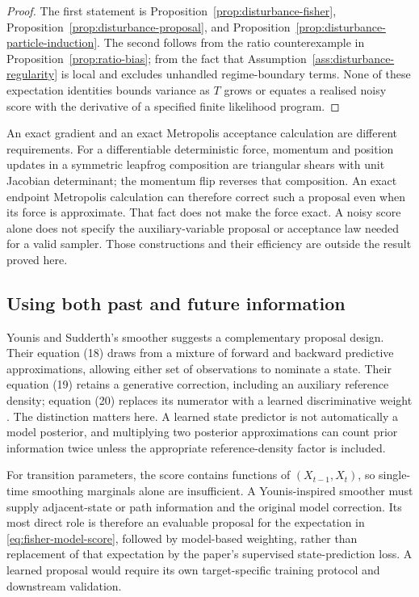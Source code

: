 \documentclass[11pt]{article}
\begin{document}
\begin{proof}
The first statement is Proposition~\ref{prop:disturbance-fisher},
Proposition~\ref{prop:disturbance-proposal}, and
Proposition~\ref{prop:disturbance-particle-induction}. The second follows from the
ratio counterexample in Proposition~\ref{prop:ratio-bias}; from the fact that
Assumption~\ref{ass:disturbance-regularity} is local and excludes unhandled
regime-boundary terms. None of these expectation identities bounds variance
as $T$ grows or equates a realised noisy score with the derivative of a
specified finite likelihood program.
\end{proof}

An exact gradient and an exact Metropolis acceptance calculation are
different requirements. For a differentiable deterministic force, momentum
and position updates in a symmetric leapfrog composition are triangular
shears with unit Jacobian determinant; the momentum flip reverses that
composition. An exact endpoint Metropolis calculation can therefore
correct such a proposal even when its force is approximate. That fact does
not make the force exact. A noisy score alone
does not specify the auxiliary-variable proposal or acceptance law needed
for a valid sampler. Those constructions and their efficiency are outside
the result proved here.

\subsection{Using both past and future information}

Younis and Sudderth's smoother suggests a complementary proposal design.
Their equation (18) draws from a mixture of forward and backward predictive
approximations, allowing either set of observations to nominate a state.
Their equation (19) retains a generative correction, including an auxiliary
reference density; equation (20) replaces its numerator with a learned
discriminative weight \citep[Section 4]{younis2024}. The distinction matters
here. A learned state predictor is not automatically a model posterior, and
multiplying two posterior approximations can count prior information twice
unless the appropriate reference-density factor is included.

For transition parameters, the score contains functions of
$(X_{t-1},X_t)$, so single-time smoothing marginals alone are insufficient.
A Younis-inspired smoother must supply adjacent-state or path information
and the original model correction. Its most direct role is therefore an
evaluable proposal for the expectation in \eqref{eq:fisher-model-score},
followed by model-based weighting, rather than replacement of that expectation
by the paper's supervised state-prediction loss. A learned proposal would
require its own target-specific training protocol and downstream validation.
\end{document}
